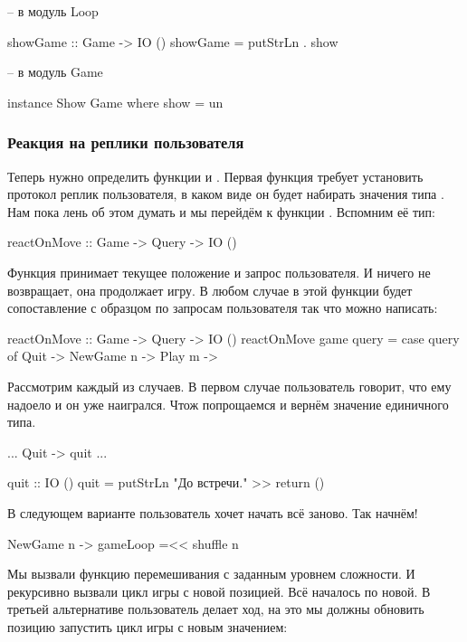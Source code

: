 \begin{code}
-- в модуль Loop

showGame :: Game -> IO ()
showGame = putStrLn . show 

-- в модуль Game

instance Show Game where
    show = un
\end{code}

\subsubsection{Реакция на реплики пользователя}

Теперь нужно определить функции  и .
Первая функция требует установить протокол реплик пользователя, в каком
виде он будет набирать значения типа . Нам пока лень об этом
думать и мы перейдём к функции . Вспомним её тип:


\begin{code}
reactOnMove :: Game -> Query -> IO ()
\end{code}

Функция принимает текущее положение и запрос пользователя. И ничего не
возвращает, она продолжает игру. В любом случае в этой функции будет
сопоставление с образцом по запросам пользователя так что можно
написать:


\begin{code}
reactOnMove :: Game -> Query -> IO ()
reactOnMove game query = case query of
    Quit        -> 
    NewGame n   -> 
    Play    m   -> 
\end{code}

Рассмотрим каждый из случаев. В первом случае пользователь говорит, что
ему надоело и он уже наигрался. Чтож попрощаемся и вернём значение
единичного типа.


\begin{code}
...
    Quit        -> quit
...

quit :: IO ()
quit = putStrLn "До встречи." >> return ()
\end{code}

В следующем варианте пользователь хочет начать всё заново. Так начнём!


\begin{code}
    NewGame n   -> gameLoop =<< shuffle n
\end{code}

Мы вызвали функцию перемешивания  с заданным уровнем
сложности. И рекурсивно вызвали цикл игры с новой позицией. Всё началось
по новой. В третьей альтернативе пользователь делает ход, на это мы
должны обновить позицию запустить цикл игры с новым значением:


